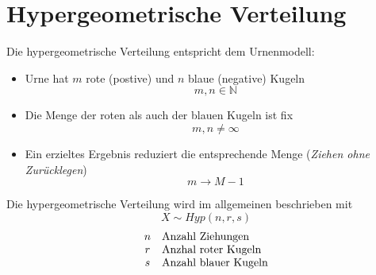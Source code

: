 \section{Hypergeometrische Verteilung}
Die hypergeometrische Verteilung entspricht dem Urnenmodell:
\begin{itemize}
	\item Urne hat $m$ rote (postive) und $n$ blaue (negative)
		Kugeln
		\[ m,n \in \mathbb{N} \]
	\item Die Menge der roten als auch der blauen Kugeln ist fix 
		\[ m,n \neq \infty \]
	\item Ein erzieltes Ergebnis reduziert die entsprechende Menge
		(\emph{Ziehen ohne Zurücklegen})
		\[ m \rightarrow  M - 1\]
\end{itemize}
Die hypergeometrische Verteilung wird im allgemeinen beschrieben mit
\[  
	X \sim Hyp(n,r,s)
\]
\[ \begin{array}{c l}
	n & \text{Anzahl Ziehungen} \\
	r & \text{Anzhal roter Kugeln} \\
	s & \text{Anzahl blauer Kugeln}
\end{array} \]


